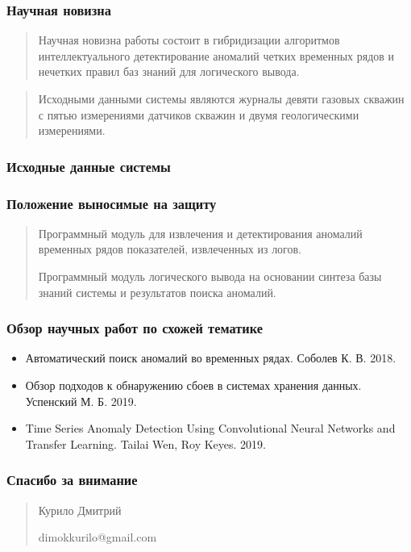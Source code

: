 \documentclass[aspectratio=1610,17pt,utf8]{beamer}
\begin{document}
	\begin{frame}
		\frametitle{Научная новизна}
		\begin{quotation}
			Научная новизна работы состоит в гибридизации алгоритмов интеллектуального детектирование аномалий четких временных рядов и нечетких правил баз знаний для логического вывода.
		\end{quotation}
	\end{frame}
	

	\begin{frame} 
	    \begin{quotation}
			Исходными данными системы являются журналы девяти газовых скважин с пятью измерениями датчиков скважин и двумя геологическими измерениями.
		\end{quotation}
		\frametitle{Исходные данные системы}
        
	\end{frame}
	

	
	\begin{frame} 
		\frametitle{Положение выносимые на защиту}
		\begin{quotation}
		    Программный модуль для извлечения и детектирования аномалий временных рядов показателей, извлеченных из логов.
		    
		    Программный модуль логического вывода на основании синтеза базы знаний системы и результатов поиска аномалий.
	    \end{quotation}
	\end{frame}
	
	\begin{frame} 
		\frametitle{Обзор научных работ по схожей тематике}
		    \begin{itemize}
		   \item Автоматический поиск аномалий во временных рядах. Соболев К. В. 2018.
		   \item Обзор подходов к обнаружению сбоев в системах хранения данных. Успенский М. Б. 2019.
		   \item Time Series Anomaly Detection Using Convolutional Neural Networks and Transfer Learning. Tailai Wen, Roy Keyes. 2019.
		\end{itemize}
	\end{frame}


    \begin{frame} 
		\frametitle{Спасибо за внимание}
		   \begin{quotation}
		    Курило Дмитрий
		    
		    dimokkurilo@gmail.com
	    \end{quotation}
	\end{frame}
\end{document}
